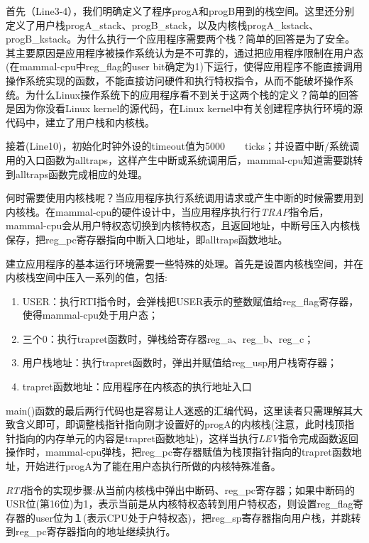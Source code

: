 首先（Line3-4），我们明确定义了程序progA和progB用到的栈空间。这里还分别定义了用户栈progA\_stack、progB\_stack，以及内核栈progA\_kstack、progB\_kstack。为什么执行一个应用程序需要两个栈？简单的回答是为了安全。其主要原因是应用程序被操作系统认为是不可靠的，通过把应用程序限制在用户态(在mammal-cpu中reg\_flag的user bit确定为1)下运行，使得应用程序不能直接调用操作系统实现的函数，不能直接访问硬件和执行特权指令，从而不能破坏操作系统。为什么Linux操作系统下的应用程序看不到关于这两个栈的定义？简单的回答是因为你没看Linux kernel的源代码，在Linux kernel中有关创建程序执行环境的源代码中，建立了用户栈和内核栈。

接着(Line10)，初始化时钟外设的timeout值为5000　　ticks；并设置中断/系统调用的入口函数为alltraps，这样产生中断或系统调用后，mammal-cpu知道需要跳转到alltraps函数完成相应的处理。

何时需要使用内核栈呢？当应用程序执行系统调用请求或产生中断的时候需要用到内核栈。在mammal-cpu的硬件设计中，当应用程序执行行\textit{TRAP}指令后，mammal-cpu会从用户特权态切换到内核特权态，且返回地址，中断号压入内核栈保存，把reg\_pc寄存器指向中断入口地址，即alltraps函数地址。

建立应用程序的基本运行环境需要一些特殊的处理。首先是设置内核栈空间，并在内核栈空间中压入一系列的值，包括:
\begin{enumerate}
	\item USER：执行RTI指令时，会弹栈把USER表示的整数赋值给reg\_flag寄存器，使得mammal-cpu处于用户态；
	\item 三个0：执行trapret函数时，弹栈给寄存器reg\_a、reg\_b、reg\_c；
	\item 用户栈地址：执行trapret函数时，弹出并赋值给reg\_usp用户栈寄存器；
	\item trapret函数地址：应用程序在内核态的执行地址入口
\end{enumerate}

main()函数的最后两行代码也是容易让人迷惑的汇编代码，这里读者只需理解其大致含义即可，即调整栈指针指向刚才设置好的progA的内核栈(注意，此时栈顶指针指向的内存单元的内容是trapret函数地址)，这样当执行\textit{LEV}指令完成函数返回操作时，mammal-cpu弹栈，把reg\_pc寄存器赋值为栈顶指针指向的trapret函数地址，开始进行progA为了能在用户态执行所做的内核特殊准备。

\begin{note} 
	\textit{RTI}指令的实现步骤:从当前内核栈中弹出中断码、reg\_pc寄存器；如果中断码的USR位(第16位)为1，表示当前是从内核特权态转到用户特权态，则设置reg\_flag寄存器的user位为１(表示CPU处于户特权态)，把reg\_sp寄存器指向用户栈，并跳转到reg\_pc寄存器指向的地址继续执行。
\end{note} 

